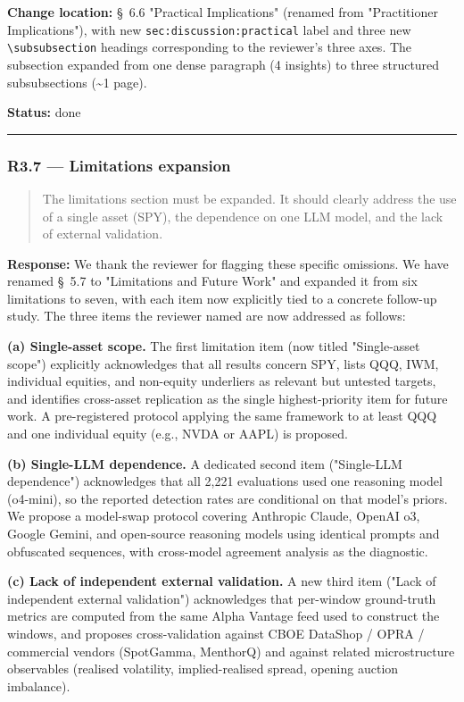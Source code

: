 \documentclass[11pt,a4paper]{article}
\begin{document}
\textbf{Change location:} \S{}~6.6 "Practical Implications" (renamed from
"Practitioner Implications"), with new \texttt{sec:discussion:practical} label
and three new \texttt{\textbackslash{}subsubsection} headings corresponding to the
reviewer's three axes. The subsection expanded from one dense
paragraph (4 insights) to three structured subsubsections (\textasciitilde{}1 page).

\textbf{Status:} done

\bigskip\hrule\bigskip

\subsubsection*{R3.7 --- Limitations expansion}

\begin{quote}
The limitations section must be expanded. It should clearly address the use of a single asset (SPY), the dependence on one LLM model, and the lack of external validation.
\end{quote}

\textbf{Response:} We thank the reviewer for flagging these specific omissions.
We have renamed \S{}~5.7 to "Limitations and Future Work" and expanded it
from six limitations to seven, with each item now explicitly tied to a
concrete follow-up study. The three items the reviewer named are now
addressed as follows:

\textbf{(a) Single-asset scope.} The first limitation item (now titled
"Single-asset scope") explicitly acknowledges that all results concern
SPY, lists QQQ, IWM, individual equities, and non-equity underliers as
relevant but untested targets, and identifies cross-asset replication as
the single highest-priority item for future work. A pre-registered
protocol applying the same framework to at least QQQ and one individual
equity (e.g., NVDA or AAPL) is proposed.

\textbf{(b) Single-LLM dependence.} A dedicated second item ("Single-LLM
dependence") acknowledges that all 2,221 evaluations used one reasoning
model (o4-mini), so the reported detection rates are conditional on
that model's priors. We propose a model-swap protocol covering Anthropic
Claude, OpenAI o3, Google Gemini, and open-source reasoning models
using identical prompts and obfuscated sequences, with cross-model
agreement analysis as the diagnostic.

\textbf{(c) Lack of independent external validation.} A new third item
("Lack of independent external validation") acknowledges that per-window
ground-truth metrics are computed from the same Alpha Vantage feed used
to construct the windows, and proposes cross-validation against CBOE
DataShop / OPRA / commercial vendors (SpotGamma, MenthorQ) and against
related microstructure observables (realised volatility,
implied-realised spread, opening auction imbalance).
\end{document}
